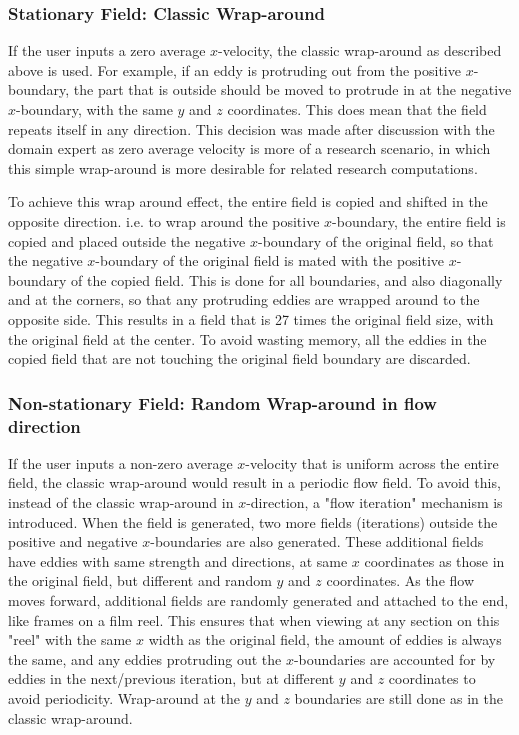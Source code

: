\documentclass[12pt, titlepage]{article}
\begin{document}
\subsubsection{Stationary Field: Classic Wrap-around}
If the user inputs a zero average $x$-velocity, the classic wrap-around as described above is used. For example, if an eddy is protruding out from the positive $x$-boundary, the part that is outside should be moved to protrude in at the negative $x$-boundary, with the same $y$ and $z$ coordinates. This does mean that the field repeats itself in any direction. This decision was made after discussion with the domain expert as zero average velocity is more of a research scenario, in which this simple wrap-around is more desirable for related research computations.

To achieve this wrap around effect, the entire field is copied and shifted in the opposite direction. i.e. to wrap around the positive $x$-boundary, the entire field is copied and placed outside the negative $x$-boundary of the original field, so that the negative $x$-boundary of the original field is mated with the positive $x$-boundary of the copied field. This is done for all boundaries, and also diagonally and at the corners, so that any protruding eddies are wrapped around to the opposite side. This results in a field that is 27 times the original field size, with the original field at the center. To avoid wasting memory, all the eddies in the copied field that are not touching the original field boundary are discarded.

\subsubsection{Non-stationary Field: Random Wrap-around in flow direction}
If the user inputs a non-zero average $x$-velocity that is uniform across the entire field, the classic wrap-around would result in a periodic flow field. To avoid this, instead of the classic wrap-around in $x$-direction, a "flow iteration" mechanism is introduced. When the field is generated, two more fields (iterations) outside the positive and negative $x$-boundaries are also generated. These additional fields have eddies with same strength and directions, at same $x$ coordinates as those in the original field, but different and random $y$ and $z$ coordinates. As the flow moves forward, additional fields are randomly generated and attached to the end, like frames on a film reel. This ensures that when viewing at any section on this "reel" with the same $x$ width as the original field, the amount of eddies is always the same, and any eddies protruding out the $x$-boundaries are accounted for by eddies in the next/previous iteration, but at different $y$ and $z$ coordinates to avoid periodicity. Wrap-around at the $y$ and $z$ boundaries are still done as in the classic wrap-around.
\end{document}
